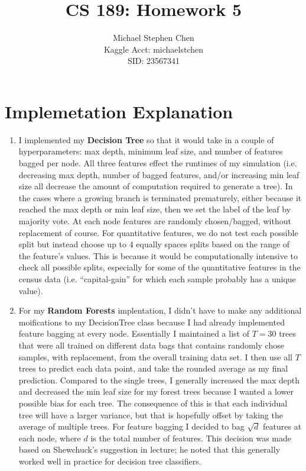 \documentclass{article}
\title{CS 189: Homework 5}
\author{Michael Stephen Chen\\ Kaggle Acct: michaelstchen \\SID: 23567341}
\begin{document}
\maketitle

\pagebreak

\section*{Implemetation Explanation}
\begin{enumerate}
  \item I implemented my \textbf{Decision Tree} so that it would take in a couple of hyperparameters: max depth, minimum leaf size, and number of features bagged per node. All three features effect the runtimes of my simulation (i.e. decreasing max depth, number of bagged features, and/or increasing min leaf size all decrease the amount of computation required to generate a tree). In the cases where a growing branch is terminated prematurely, either because it reached the max depth or min leaf size, then we set the label of the leaf by majority vote. At each node features are randomly chosen/bagged, without replacement of course. For quantitative features, we do not test each possible split but instead choose up to 4 equally spaces splits based on the range of the feature's values. This is because it would be computationally intensive to check all possible splits, especially for some of the quantitative features in the census data (i.e. ``capital-gain'' for which each sample probably has a unique value).
  
  \item For my \textbf{Random Forests} implentation, I didn't have to make any additional moifications to my DecisionTree class because I had already implemented feature bagging at every node. Essentially I maintained a list of $T=30$ trees that were all trained on different data bags that contains randomly chose samples, with replacement, from the overall training data set. I then use all $T$ trees to predict each data point, and take the rounded average as my final prediction. Compared to the single trees, I generally increased the max depth and decreased the min leaf size for my forest trees because I wanted a lower possible bias for each tree. The consequence of this is that each individual tree will have a larger variance, but that is hopefully offset by taking the average of multiple trees. For feature bagging I decided to bag $\sqrt{d}$ features at each node, where $d$ is the total number of features. This decision was made based on Shewchuck's suggestion in lecture; he noted that this generally worked well in practice for decision tree classifiers. 
\end{enumerate}
\end{document}
